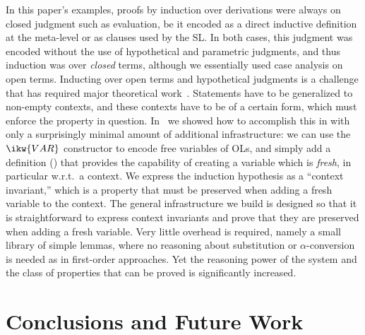 \documentclass[final]{svjour3}
\begin{document}
In this paper's examples, proofs by induction over derivations were
always on closed judgment such as evaluation, be it encoded as a
direct inductive definition at the meta-level or as  clauses
used by the SL\@.  In both cases, this judgment was encoded without
the use of hypothetical and parametric judgments, and thus induction
was over \emph{closed} terms, although we essentially used case
analysis on open terms.  Inducting over open terms and hypothetical
judgments is a challenge that has required major theoretical
work~\cite{S00,gacek08lics}. Statements have to be generalized to
non-empty contexts, and these contexts have to be of a certain form,
which must enforce the property in question.  In~\cite{FeltyM09} we
showed how to accomplish this in \hybrid with only a surprisingly
minimal amount of additional infrastructure: we can use the
$\ikw{VAR}$ constructor to encode free variables of OLs, and simply
add a definition () that provides the capability of
creating a variable which is \emph{fresh}, in particular w.r.t.\ a
context.  We express the induction hypothesis as a ``context
invariant,'' which is a property that must be preserved when adding a
fresh variable to the context.  The general infrastructure we
build is designed so that it is straightforward to express context
invariants and prove that they are preserved when adding a fresh
variable.  Very little overhead is required, namely a small library of
simple lemmas, where no reasoning about substitution or
$\alpha$-conversion is needed as in first-order approaches.  Yet the
reasoning power of the system and the class of properties that can be
proved is significantly increased.

\section{Conclusions and Future Work}
\label{sec:future}
\end{document}
